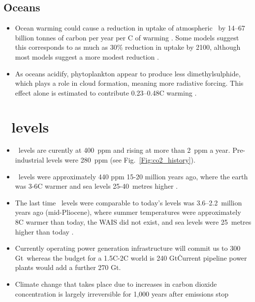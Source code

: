\documentclass[11pt]{article}
\begin{document}
\subsection{Oceans}
\begin{itemize}
\item Ocean warming could cause a reduction in uptake of atmospheric \cotwo\ by 14--67 billion tonnes of carbon per year per \textdegree{}C of warming \cite{Gruber11}. Some models suggest this corresponds to as much as 30\% reduction in uptake by 2100, although most models suggest a more modest reduction \cite{Gruber11}.
\item As oceans acidify, phytoplankton appear to produce less dimethylsulphide, which plays a role in cloud formation, meaning more radiative forcing. This effect alone is estimated to contribute 0.23--0.48\textdegree{}C warming \cite{Six13}.
\end{itemize}

\section{\cotwo\ levels}
\begin{itemize}
\item \cotwo\ levels are curently at 400~ppm and rising at more than 2~ppm a year. Pre-industrial levels were 280~ppm (see Fig.~\ref{Fig:co2_history}).
\item \cotwo\ levels were approximately 440 ppm 15-20 million years ago, where the earth was 3-6\textdegree{}C warmer and sea levels 25-40~metres higher \cite{Tripati09}.
\item The last time \cotwo\ levels were comparable to today's levels was 3.6--2.2~million years ago (mid-Pliocene), where summer temperatures were approximately 8\textdegree{}C warmer than today, the WAIS did not exist, and sea levels were 25~metres higher than today \cite{Brigham13}.
\item Currently operating power generation infrastructure will commit us to 300 Gt\cotwo\ whereas the budget for a 1.5\textdegree{}C-2\textdegree{}C world is 240  Gt\cotwo\. Current pipeline power plants would add a further 270 Gt\cotwo. \cite{Pfeiffer18} 
\item Climate change that takes place due to increases in carbon dioxide concentration is largely irreversible for 1,000 years after emissions stop \cite{Solomon09}
\end{itemize}
\end{document}
